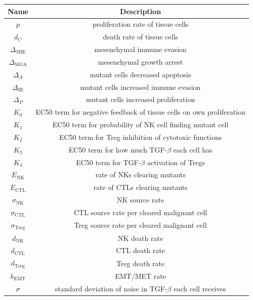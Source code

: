 \documentclass[11pt]{article}
\begin{document}
\begin{table}[H]
\begin{center}
 \begin{tabular}{|| c | c||} 
 \hline
 {\bf Name} & {\bf Description}  \\ [0.5ex] 
 \hline
 $p$ & proliferation rate of tissue cells \\ 
 \hline
 $d_C$  & death rate of tissue cells \\
 \hline
$\Delta_\text{MIE}$ &  mesenchymal immune evasion \\
 \hline
 $\Delta_\text{MGA}$ & mesenchymal growth arrest    \\
 \hline
  $\Delta_A$ & mutant cells decreased apoptosis  \\ %
  \hline
  $\Delta_\text{IE}$ & mutant cells increased immune evasion  \\
  \hline
  $\Delta_P$ & mutant cells increased proliferation  \\
  \hline
 $K_0$ & EC50 term for negative feedback of tissue cells on own proliferation\\
 \hline
 $K_1$ & EC50 term for probability of NK cell finding mutant cell\\
 \hline
  $K_2$ & EC50 term for Treg inhibition of cytotoxic functions  \\
  \hline
  $K_3$ & EC50 term for how much TGF-$\beta$ each cell has \\
  \hline
  $K_4$ & EC50 term for TGF-$\beta$ activation of Tregs \\
  \hline
 $E_\text{NK}$ & rate of NKs clearing mutants  \\
  \hline
  $E_\text{CTL}$ & rate of CTLs clearing mutants \\
  \hline
  $\sigma_\text{NK}$ & NK source rate \\ 
  \hline
  $\sigma_\text{CTL}$ & CTL source rate per cleared malignant cell \\ 
  \hline
  $\sigma_\text{Treg}$ & Treg source rate per cleared malignant cell \\ 
  \hline
  $d_\text{NK}$ & NK death rate \\ 
  \hline
  $d_\text{CTL}$ & CTL death rate \\ 
  \hline
  $d_\text{Treg}$ & Treg death rate \\ 
  \hline
  $k_\text{EMT}$ & EMT/MET rate  \\
  \hline
  $\sigma$ & standard deviation of noise in TGF-$\beta$ each cell receives  \\

\end{tabular}
\end{center}
\end{table}
\end{document}

